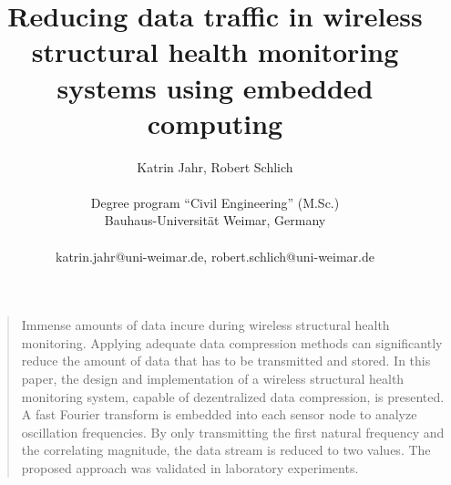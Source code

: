\documentclass[12pt,a4paper]{scrartcl}
\title{\normalfont\textbf{ \Large {Reducing data traffic in wireless structural health monitoring systems using embedded computing}}}
\author
{\large Katrin Jahr, Robert Schlich\\
\\
\normalsize{Degree program “Civil Engineering” (M.Sc.)}\\
\normalsize{Bauhaus-Universität Weimar, Germany}\\
\\
\normalsize{katrin.jahr@uni-weimar.de, }
\normalsize{robert.schlich@uni-weimar.de}
}
\date{}
\newenvironment{sciabstract}{%
\begin{quote} \bfseries}
{\end{quote}}
\begin{document}
 


\baselineskip20pt


\maketitle 

% 
\setlength{\emergencystretch}{3pt}

\begin{sciabstract}

Immense amounts of data incure during wireless structural health monitoring.
Applying adequate data compression methods can significantly reduce the amount of data that has to be transmitted and stored.
In this paper, the design and implementation of a wireless structural health monitoring system, capable of dezentralized data compression, is presented. 
A fast Fourier transform is embedded into each sensor node to analyze oscillation frequencies. 
By only transmitting the first natural frequency and the correlating magnitude, the data stream is reduced to two values.
The proposed approach was validated in laboratory experiments.



\end{sciabstract}

\end{document}
